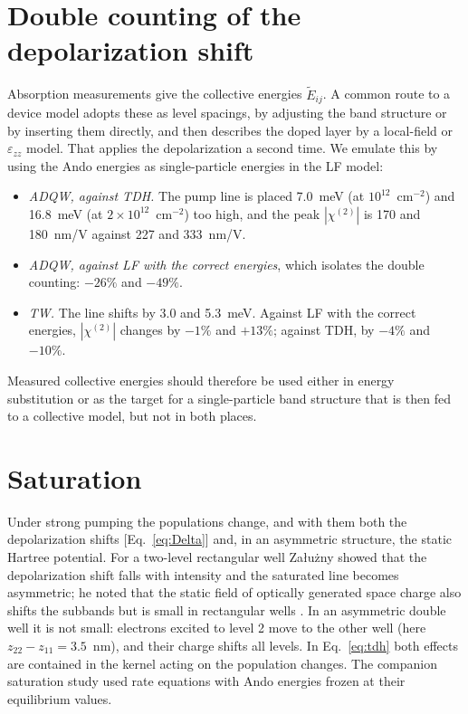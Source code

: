 \documentclass[11pt]{article}
\newcommand{\chitwo}{\chi^{(2)}}
\newcommand{\Et}{\tilde E}
\begin{document}
\section{Double counting of the depolarization shift}\label{sec:double}
Absorption measurements give the collective energies $\Et_{ij}$. A common route to a device model adopts these as level spacings, by adjusting the band structure or by inserting them directly, and then describes the doped layer by a local-field or $\varepsilon_{zz}$ model. That applies the depolarization a second time. We emulate this by using the Ando energies as single-particle energies in the LF model:
\begin{itemize}
\item \emph{ADQW, against TDH.} The pump line is placed 7.0~meV (at $10^{12}$~cm$^{-2}$) and 16.8~meV (at $2\times10^{12}$~cm$^{-2}$) too high, and the peak $|\chitwo|$ is 170 and 180~nm/V against 227 and 333~nm/V.
\item \emph{ADQW, against LF with the correct energies}, which isolates the double counting: $-26\%$ and $-49\%$.
\item \emph{TW.} The line shifts by 3.0 and 5.3~meV. Against LF with the correct energies, $|\chitwo|$ changes by $-1\%$ and $+13\%$; against TDH, by $-4\%$ and $-10\%$.
\end{itemize}
Measured collective energies should therefore be used either in energy substitution or as the target for a single-particle band structure that is then fed to a collective model, but not in both places.

\section{Saturation}\label{sec:dynamic}
Under strong pumping the populations change, and with them both the depolarization shifts [Eq.~\eqref{eq:Delta}] \cite{Zaluzny1993,Craig1996,Cominotti2023} and, in an asymmetric structure, the static Hartree potential. For a two-level rectangular well Załużny showed that the depolarization shift falls with intensity and the saturated line becomes asymmetric; he noted that the static field of optically generated space charge also shifts the subbands but is small in rectangular wells \cite{Zaluzny1993}. In an asymmetric double well it is not small: electrons excited to level 2 move to the other well (here $z_{22}-z_{11}=3.5$~nm), and their charge shifts all levels. In Eq.~\eqref{eq:tdh} both effects are contained in the kernel acting on the population changes. The companion saturation study \cite{OwnbyNL02} used rate equations with Ando energies frozen at their equilibrium values.
\end{document}
